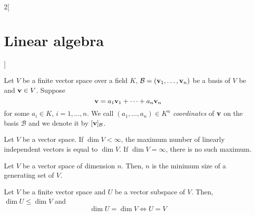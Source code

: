 \documentclass[../../../main.tex]{subfiles}
\begin{document}
\begin{multicols}{2}[\section{Linear algebra}]
\begin{definition}
  \end{definition}
  \begin{definition}
    Let $V$ be a finite vector space over a field $K$, $\mathcal{B}=(\boldsymbol{\mathrm{v}}_1,\ldots,\boldsymbol{\mathrm{v}}_n)$ be a basis of $V$ be and $\boldsymbol{\mathrm{v}}\in V$. Suppose $$\boldsymbol{\mathrm{v}}=a_1\boldsymbol{\mathrm{v}}_1+\cdots+a_n\boldsymbol{\mathrm{v}}_n$$ for some $a_i\in K$, $i=1,\ldots,n$. We call $(a_1,\ldots,a_n)\in K^n$ \emph{coordinates} of $\boldsymbol{\mathrm{v}}$ on the basis $\mathcal{B}$ and we denote it by $[\boldsymbol{\mathrm{v}}]_{\mathcal{B}}$.
  \end{definition}
  \begin{proposition}
    Let $V$ be a vector space. If $\dim V<\infty$, the maximum number of linearly independent vectors is equal to $\dim V$. If $\dim V=\infty$, there is no such maximum.
  \end{proposition}
  \begin{proposition}
    Let $V$ be a vector space of dimension $n$. Then, $n$ is the minimum size of a generating set of $V$.
  \end{proposition}
  \begin{proposition}
    Let $V$ be a finite vector space and $U$ be a vector subspace of $V$. Then, $\dim U\leq\dim V$ and $$\dim U=\dim V\iff U=V$$
  \end{proposition}

\end{multicols}
\end{document}

